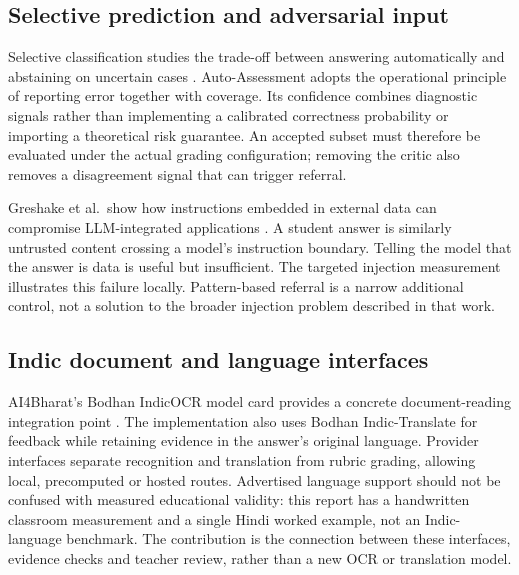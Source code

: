 \subsection{Selective prediction and adversarial input}
Selective classification studies the trade-off between answering automatically and abstaining on uncertain cases \citep{geifman2017selective}. Auto-Assessment adopts the operational principle of reporting error together with coverage. Its confidence combines diagnostic signals rather than implementing a calibrated correctness probability or importing a theoretical risk guarantee. An accepted subset must therefore be evaluated under the actual grading configuration; removing the critic also removes a disagreement signal that can trigger referral.

Greshake et al.\ show how instructions embedded in external data can compromise LLM-integrated applications \citep{greshake2023injection}. A student answer is similarly untrusted content crossing a model's instruction boundary. Telling the model that the answer is data is useful but insufficient. The targeted injection measurement illustrates this failure locally. Pattern-based referral is a narrow additional control, not a solution to the broader injection problem described in that work.

\subsection{Indic document and language interfaces}
AI4Bharat's Bodhan IndicOCR model card provides a concrete document-reading integration point \citep{indicocr}. The implementation also uses Bodhan Indic-Translate for feedback while retaining evidence in the answer's original language. Provider interfaces separate recognition and translation from rubric grading, allowing local, precomputed or hosted routes. Advertised language support should not be confused with measured educational validity: this report has a handwritten classroom measurement and a single Hindi worked example, not an Indic-language benchmark. The contribution is the connection between these interfaces, evidence checks and teacher review, rather than a new OCR or translation model.
